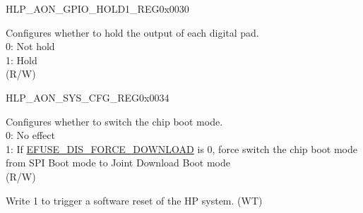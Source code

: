 \begin{register}{H}{LP\_AON\_GPIO\_HOLD1\_REG}{0x0030}\label{regdesc:LPAONGPIOHOLD1REG}
%
\regnewline%
\begin{regdesc}\begin{reglist}
\label{fielddesc:LPAONGPIOHOLD1}\item [LP\_AON\_GPIO\_HOLD1] Configures whether to hold the output of each digital pad.\\
0: Not hold\\
1: Hold\\
(R/W)
\end{reglist}\end{regdesc}
\end{register}


\begin{register}{H}{LP\_AON\_SYS\_CFG\_REG}{0x0034}\label{regdesc:LPAONSYSCFGREG}
%
%
%
\regnewline%
\begin{regdesc}\begin{reglist}
\label{fielddesc:LPAONFORCEDOWNLOADBOOT}\item [LP\_AON\_FORCE\_DOWNLOAD\_BOOT] Configures whether to switch the chip boot mode.\\
0: No effect\\
1: If \hyperref[fielddesc:EFUSEDISFORCEDOWNLOAD]{EFUSE\_DIS\_FORCE\_DOWNLOAD} is 0, force switch the chip boot mode from SPI Boot mode to Joint Download Boot mode\\
(R/W)
\label{fielddesc:LPAONHPSYSSWRESET}\item [LP\_AON\_HPSYS\_SW\_RESET] Write 1 to trigger a software reset of the HP system. (WT)
\end{reglist}\end{regdesc}
\end{register}


